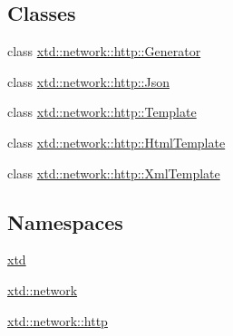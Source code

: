 \subsection*{Classes}
\begin{DoxyCompactItemize}
\item 
class \hyperlink{classxtd_1_1network_1_1http_1_1Generator}{xtd\+::network\+::http\+::\+Generator}
\item 
class \hyperlink{classxtd_1_1network_1_1http_1_1Json}{xtd\+::network\+::http\+::\+Json}
\item 
class \hyperlink{classxtd_1_1network_1_1http_1_1Template}{xtd\+::network\+::http\+::\+Template}
\item 
class \hyperlink{classxtd_1_1network_1_1http_1_1HtmlTemplate}{xtd\+::network\+::http\+::\+Html\+Template}
\item 
class \hyperlink{classxtd_1_1network_1_1http_1_1XmlTemplate}{xtd\+::network\+::http\+::\+Xml\+Template}
\end{DoxyCompactItemize}
\subsection*{Namespaces}
\begin{DoxyCompactItemize}
\item 
 \hyperlink{namespacextd}{xtd}
\item 
 \hyperlink{namespacextd_1_1network}{xtd\+::network}
\item 
 \hyperlink{namespacextd_1_1network_1_1http}{xtd\+::network\+::http}
\end{DoxyCompactItemize}
